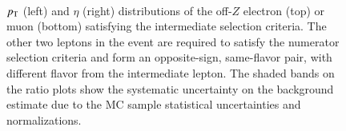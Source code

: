 \begin{figure}[htbp]
{    
  } \\
  \caption{$p_{\text{T}}$ (left) and $\eta$ (right) distributions of the off-$Z$ electron (top) or muon (bottom) satisfying the intermediate selection criteria. The other two leptons in the event are required to satisfy the numerator selection criteria and form an opposite-sign, same-flavor pair, with different flavor from the intermediate lepton. The shaded bands on the ratio plots show the systematic uncertainty on the background estimate due to the MC sample statistical uncertainties and normalizations.}
  \label{fig:model-independent-VR-intermediate-emu}
\end{figure}


